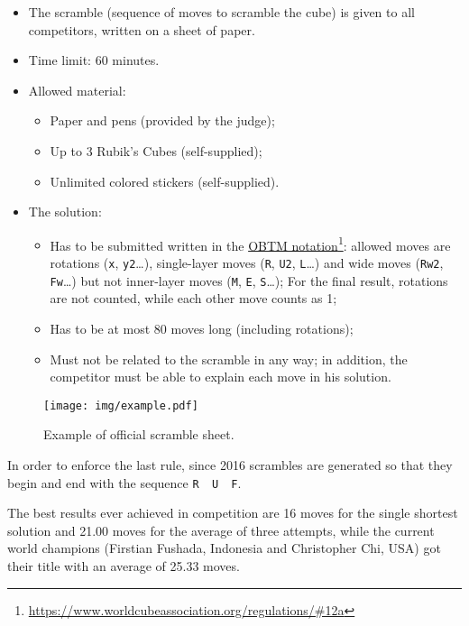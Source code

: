 \documentclass[11pt,a4paper]{book}
\newcommand{\p}{\textquotesingle}
\newcommand{\m}{\texttt}
\newcommand{\ps}{\p\,\,}
\begin{document}
\begin{itemize}
\item The scramble (sequence of moves to scramble the cube) is given to all competitors, written on a sheet of paper.
\item Time limit: 60 minutes.
\item Allowed material:
\begin{itemize}
\item Paper and pens (provided by the judge);
\item Up to 3 Rubik's Cubes (self-supplied);
\item Unlimited colored stickers (self-supplied).
\end{itemize}
\item The solution:
\begin{itemize}
\item Has to be submitted written in the \href{https://www.worldcubeassociation.org/regulations/\#12a}{OBTM notation}\footnote{\url{https://www.worldcubeassociation.org/regulations/\#12a}}: allowed moves are rotations (\m x, \m{y2}\dots), single-layer moves (\m{R}, \m{U2}, \m {L\p}\dots) and wide moves (\m{Rw2}, \m{Fw\p}\dots) but not inner-layer moves (\m M, \m E, \m S\dots); For the final result, rotations are not counted, while each other move counts as 1;
\item Has to be at most 80 moves long (including rotations);
\item Must not be related to the scramble in any way; in addition, the competitor must be able to explain each move in his solution.
\end{itemize}
\end{itemize}

\begin{figure}
\begin{center}
\texttt{[image: img/example.pdf]}
\end{center}
\caption{Example of official scramble sheet.}
\end{figure}

In order to enforce the last rule, since 2016 scrambles are generated so that they begin and end with the sequence \m{R\ps U\ps F}.

The best results ever achieved in competition are 16 moves for the single shortest solution and 21.00 moves for the average of three attempts, while the current world champions (Firstian Fushada, Indonesia and Christopher Chi, USA) got their title with an average of 25.33 moves.
\end{document}
